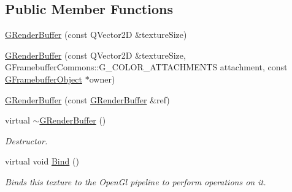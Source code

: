 \subsection*{Public Member Functions}
\begin{DoxyCompactItemize}
\item 
\mbox{\hyperlink{class_geometry_engine_1_1_geometry_buffer_1_1_g_render_buffer_a2773a6ecf7fa8ee49b45b3f0a99b5b4b}{G\+Render\+Buffer}} (const Q\+Vector2D \&texture\+Size)
\item 
\mbox{\hyperlink{class_geometry_engine_1_1_geometry_buffer_1_1_g_render_buffer_a9e59998fe3f0dadc0458c1c9755b635a}{G\+Render\+Buffer}} (const Q\+Vector2D \&texture\+Size, G\+Framebuffer\+Commons\+::\+G\+\_\+\+C\+O\+L\+O\+R\+\_\+\+A\+T\+T\+A\+C\+H\+M\+E\+N\+TS attachment, const \mbox{\hyperlink{class_geometry_engine_1_1_geometry_buffer_1_1_g_framebuffer_object}{G\+Framebuffer\+Object}} $\ast$owner)
\item 
\mbox{\hyperlink{class_geometry_engine_1_1_geometry_buffer_1_1_g_render_buffer_ac2ea09ec4bd5f76a51f33978196aa6f8}{G\+Render\+Buffer}} (const \mbox{\hyperlink{class_geometry_engine_1_1_geometry_buffer_1_1_g_render_buffer}{G\+Render\+Buffer}} \&ref)
\item 
\mbox{\label{class_geometry_engine_1_1_geometry_buffer_1_1_g_render_buffer_a863e9f2daf8bb32cfe74c12fdbf11766}} 
virtual \mbox{\hyperlink{class_geometry_engine_1_1_geometry_buffer_1_1_g_render_buffer_a863e9f2daf8bb32cfe74c12fdbf11766}{$\sim$\+G\+Render\+Buffer}} ()
\begin{DoxyCompactList}\small\item\em Destructor. \end{DoxyCompactList}\item 
\mbox{\label{class_geometry_engine_1_1_geometry_buffer_1_1_g_render_buffer_a6c9f28ec775f476206b3b18646506cb8}} 
virtual void \mbox{\hyperlink{class_geometry_engine_1_1_geometry_buffer_1_1_g_render_buffer_a6c9f28ec775f476206b3b18646506cb8}{Bind}} ()
\begin{DoxyCompactList}\small\item\em Binds this texture to the Open\+Gl pipeline to perform operations on it. \end{DoxyCompactList}\item 
\mbox{\label{class_geometry_engine_1_1_geometry_buffer_1_1_g_render_buffer_ac04be958223e7258bc2d6b8700df9df9}} 

\end{DoxyCompactItemize}
